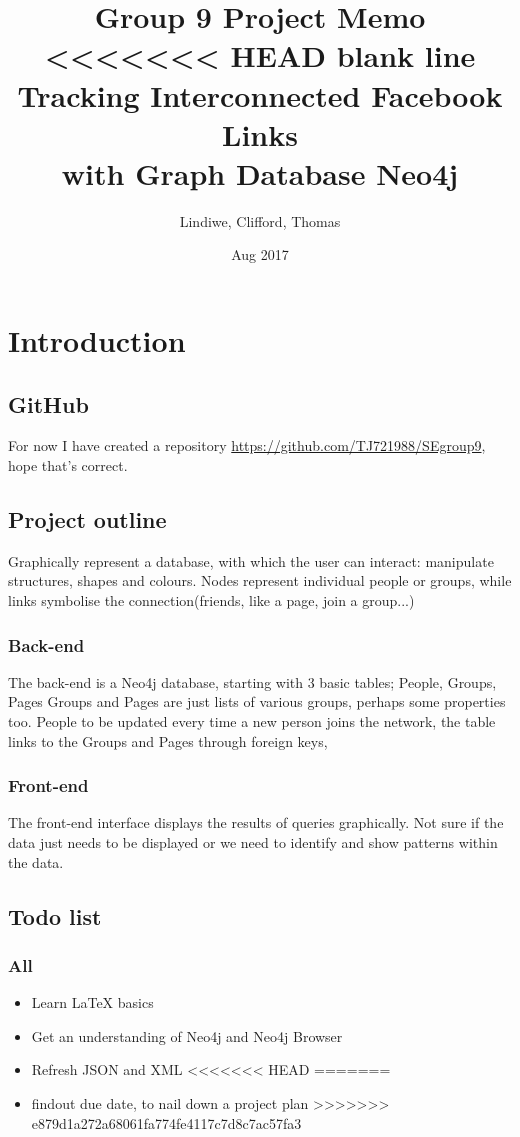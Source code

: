\documentclass[11pt]{article}
\title{%
Group 9 Project Memo\\\large
<<<<<<< HEAD
\color{white} blank line\\
\color{black}
Tracking Interconnected Facebook Links\\
with Graph Database Neo4j}
\date{Aug 2017}
\author{Lindiwe, Clifford, Thomas}
\begin{document}
\maketitle
{}
\newpage
\tableofcontents
\newpage
{}
\section{Introduction}
\subsection{GitHub}
For now I have created a repository \url{https://github.com/TJ721988/SEgroup9}, hope that's correct.

\subsection{Project outline}
Graphically represent a database, with which the user can interact: manipulate structures, shapes and colours. 
Nodes represent individual people or groups, while links symbolise the connection(friends, like a page, join a group...)
\subsubsection{Back-end}
The back-end is a Neo4j database, starting with 3 basic tables; People, Groups, Pages
Groups and Pages are just lists of various groups, perhaps some properties too.
People to be updated every time a new person joins the network, the table links to the Groups and Pages through foreign keys,

\subsubsection{Front-end}
The front-end interface displays the results of queries graphically. 
Not sure if the data just needs to be displayed or we need to identify and show patterns within the data. 

\subsection{Todo list}
\subsubsection{All}
\begin{itemize}
\item Learn LaTeX basics
\item Get an understanding of Neo4j and Neo4j Browser
\item Refresh JSON and XML
<<<<<<< HEAD
=======
\item findout due date, to nail down a project plan
>>>>>>> e879d1a272a68061fa774fe4117c7d8c7ac57fa3
\end{itemize}
\end{document}
